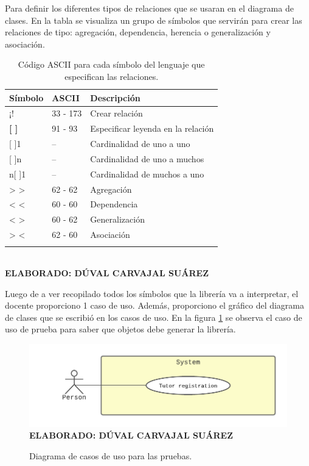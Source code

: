 Para definir los diferentes tipos de relaciones que se usaran en el diagrama de clases. En la tabla se visualiza un grupo de símbolos que servirán para crear las relaciones de tipo: agregación, dependencia, herencia o generalización y asociación. 

\begin{table}[h!]
	\caption{Código ASCII para cada símbolo del lenguaje que especifican las relaciones.}
	\begin{tabular}{p{2cm}p{4cm}p{6cm}}
		\toprule
		\textbf{Símbolo} & \textbf{ASCII} & \textbf{Descripción} \\
		\midrule
		¡! & 33 - 173 & Crear relación \\
		\addlinespace
		\textbf{[ ]} & 91 - 93 & Especificar leyenda en la relación \\
		\addlinespace
		1[ ]1 & -- & Cardinalidad de uno a uno \\
		\addlinespace
		1[ ]n & -- & Cardinalidad de uno a muchos \\
		\addlinespace
		n[ ]1 & -- & Cardinalidad de muchos a uno \\
		\addlinespace
		> > & 62 - 62 & Agregación \\
		\addlinespace
		< < & 60 - 60 & Dependencia \\
		\addlinespace
		< > & 60 - 62 & Generalización \\
		\addlinespace
		> < & 62 - 60 & Asociación \\
		\addlinespace
		\bottomrule
	\end{tabular}
	\textbf{ \\ ELABORADO: DÚVAL CARVAJAL SUÁREZ}
\end{table}

Luego de a ver recopilado todos los símbolos que la librería va a interpretar, el docente proporciono 1 caso de uso. Además, proporciono el gráfico del diagrama de clases que se escribió en los casos de uso. En la figura \ref{fig:usecasetest} se observa el caso de uso de prueba para saber que objetos debe generar la librería. 

\begin{figure}[h!]
	\caption{Diagrama de casos de uso para las pruebas.}
	\includegraphics[width=15cm]{img/usecaseTest.png}
	\label{fig:usecasetest}
	\textbf{\\ ELABORADO: DÚVAL CARVAJAL SUÁREZ}
\end{figure}

